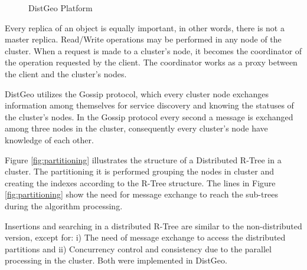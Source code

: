 \begin{figure}[h]
  \centering
   \qquad
  \caption{DistGeo Platform}
  \label{fig:dist}
\end{figure}
	
Every replica of an object is equally important, in other words, there is not a master replica. Read/Write operations may be performed in any node of the cluster. 
When a request is made to a cluster's node, it becomes the coordinator of the operation requested by the client. The coordinator works as a proxy between the client and the cluster's nodes. 
	
DistGeo utilizes the Gossip protocol, which every cluster node exchanges information among themselves for service discovery and knowing the statuses of the cluster's nodes. 
In the Gossip protocol every second a message is exchanged among three nodes in the cluster, consequently every cluster's node have knowledge of each other. 

Figure \ref{fig:partitioning} illustrates the structure of a Distributed R-Tree in a cluster. The partitioning it is performed grouping the nodes in cluster and creating the indexes according to the R-Tree structure. 
The lines in Figure \ref{fig:partitioning} show the need for message exchange to reach the sub-trees during the algorithm processing. 

Insertions and searching in a distributed R-Tree are similar to the non-distributed version, except for: i) The need of message exchange to access the distributed partitions and
ii) Concurrency control and consistency due to the parallel processing in the cluster. Both were implemented in DistGeo.

